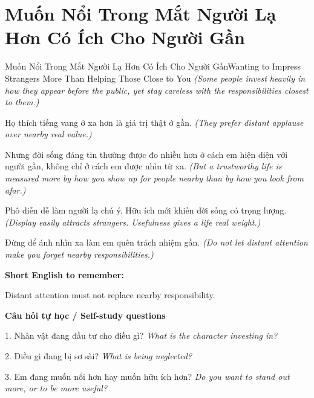 \section{Muốn Nổi Trong Mắt Người Lạ Hơn Có Ích Cho Người Gần}
\begin{truyen}{Muốn Nổi Trong Mắt Người Lạ Hơn Có Ích Cho Người Gần}{Wanting to Impress Strangers More Than Helping Those Close to You}
\textit{(Some people invest heavily in how they appear before the public, yet stay careless with the responsibilities closest to them.)}

Họ thích tiếng vang ở xa hơn là giá trị thật ở gần.
\textit{(They prefer distant applause over nearby real value.)}

Nhưng đời sống đáng tin thường được đo nhiều hơn ở cách em hiện diện với người gần, không chỉ ở cách em được nhìn từ xa.
\textit{(But a trustworthy life is measured more by how you show up for people nearby than by how you look from afar.)}

Phô diễn dễ làm người lạ chú ý. Hữu ích mới khiến đời sống có trọng lượng.
\textit{(Display easily attracts strangers. Usefulness gives a life real weight.)}

\end{truyen}

\begin{baihoc}
Đừng để ánh nhìn xa làm em quên trách nhiệm gần.
\textit{(Do not let distant attention make you forget nearby responsibilities.)}
\end{baihoc}

\begin{ghinhoanh}
\textbf{Short English to remember:}

Distant attention must not replace nearby responsibility.

\end{ghinhoanh}

\begin{tuhocnhanh}
\textbf{Câu hỏi tự học / Self-study questions}

1. Nhân vật đang đầu tư cho điều gì? \textit{What is the character investing in?}

2. Điều gì đang bị sơ sài? \textit{What is being neglected?}

3. Em đang muốn nổi hơn hay muốn hữu ích hơn? \textit{Do you want to stand out more, or to be more useful?}
\end{tuhocnhanh}
\ngancach

